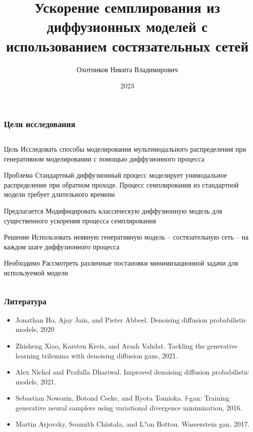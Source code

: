 \documentclass[8pt]{beamer}
\title[]{Ускорение семплирования из диффузионных моделей с использованием состязательных сетей}
\author{Охотников Никита Владимирович}
\institute{МФТИ}
\date{2023}
\newcommand\FontUP{\fontsize{10}{12}\selectfont}
\begin{document}
{
\begin{frame}
  \titlepage
\end{frame}
}

\begin{frame}
	\frametitle{Цели исследования}
	
	\begin{columns}
		\begin{column}{0.9\textwidth}
	
			\begin{block}{Цель}
				\smallskip
			Исследовать способы моделирования мультимодального распределения при генеративном моделировании с помощью диффузионного процесса
			\end{block}	
			\vfill
			\begin{block}{Проблема}
					\smallskip
				Стандартный диффузионный процесс моделирует унимодальное распределение при обратном проходе. Процесс семплирования из стандартной модели требует длительного времени
			\end{block}	
			\vfill
			\begin{block}{Предлагается}
				\smallskip
				Модифицировать классическую диффузионную модель для существенного ускорения процесса семплирования
			\end{block}	
			\vfill
			\begin{block}{Решение}
				\smallskip
				Использовать неявную генеративную модель -- состязательную сеть -- на каждом шаге диффузионного процесса
			\end{block}	
			\vfill
			\begin{block}{Необходимо}
				\smallskip
				Рассмотреть различные постановки минимизационной задачи для используемой модели
			\end{block}	
	     \end{column}
	\end{columns}


\end{frame}

\begin{frame}
	\frametitle{Литература}
	\FontUP
	\begin{itemize}
		\item Jonathan Ho, Ajay Jain, and Pieter Abbeel. Denoising diffusion probabilistic models, 2020
		\medskip
		\item Zhisheng Xiao, Karsten Kreis, and Arash Vahdat. Tackling the generative learning trilemma with denoising diffusion gans, 2021.
		\medskip
		\item Alex Nichol and Prafulla Dhariwal. Improved denoising diffusion probabilistic models, 2021.
		\medskip
		\item Sebastian Nowozin, Botond Cseke, and Ryota Tomioka. f-gan: Training generative neural samplers using
		variational divergence minimization, 2016.
		\medskip
		\item Martin Arjovsky, Soumith Chintala, and L?on Bottou. Wasserstein gan, 2017.
	\end{itemize}
	
\end{frame}
\end{document}
